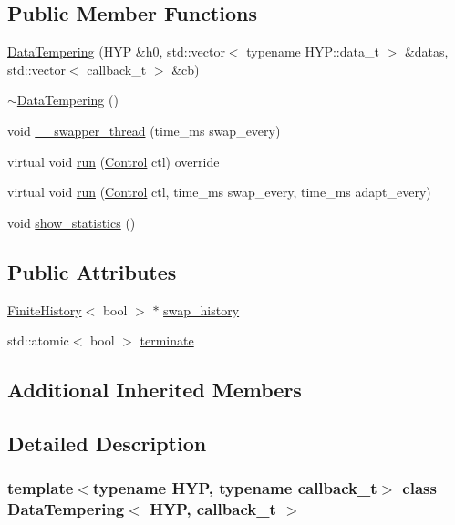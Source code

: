 \subsection*{Public Member Functions}
\begin{DoxyCompactItemize}
\item 
\hyperlink{class_data_tempering_a21a8c93e110fdcebce332300bfea5ece}{Data\+Tempering} (H\+YP \&h0, std\+::vector$<$ typename H\+Y\+P\+::data\+\_\+t $>$ \&datas, std\+::vector$<$ callback\+\_\+t $>$ \&cb)
\item 
\hyperlink{class_data_tempering_a87d7969c6e9df8682d7912a5ef9cc41a}{$\sim$\+Data\+Tempering} ()
\item 
void \hyperlink{class_data_tempering_a878981d5b443b50348fcd25a03135609}{\+\_\+\+\_\+swapper\+\_\+thread} (time\+\_\+ms swap\+\_\+every)
\item 
virtual void \hyperlink{class_data_tempering_a47b07f1c97e7f65b7694efdaa088039b}{run} (\hyperlink{struct_control}{Control} ctl) override
\item 
virtual void \hyperlink{class_data_tempering_ae1fbeeddd743c7f70c2df1a4ff458f0e}{run} (\hyperlink{struct_control}{Control} ctl, time\+\_\+ms swap\+\_\+every, time\+\_\+ms adapt\+\_\+every)
\item 
void \hyperlink{class_data_tempering_a01d9f1eb405ed44f8151bd79afd2d0cc}{show\+\_\+statistics} ()
\end{DoxyCompactItemize}
\subsection*{Public Attributes}
\begin{DoxyCompactItemize}
\item 
\hyperlink{class_finite_history}{Finite\+History}$<$ bool $>$ $\ast$ \hyperlink{class_data_tempering_a1479c10bde08cccc9764267738e429eb}{swap\+\_\+history}
\item 
std\+::atomic$<$ bool $>$ \hyperlink{class_data_tempering_a03f9c6fd8faa8f88c63bbc84c388e82d}{terminate}
\end{DoxyCompactItemize}
\subsection*{Additional Inherited Members}


\subsection{Detailed Description}
\subsubsection*{template$<$typename H\+YP, typename callback\+\_\+t$>$\newline
class Data\+Tempering$<$ H\+Y\+P, callback\+\_\+t $>$}

